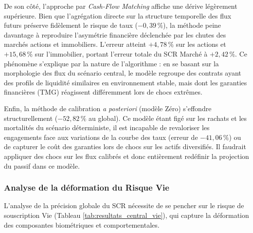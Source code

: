 De son côté, l'approche par \textit{Cash-Flow Matching} affiche une dérive légèrement supérieure. Bien que l'agrégation directe sur la structure temporelle des flux futurs préserve fidèlement le risque de taux ($-0{,}39\,\%$), la méthode peine davantage à reproduire l'asymétrie financière déclenchée par les chutes des marchés actions et immobiliers. L'erreur atteint $+4{,}78\,\%$ sur les actions et $+15{,}68\,\%$ sur l'immobilier, portant l'erreur totale du SCR Marché à $+2{,}42\,\%$. Ce phénomène s'explique par la nature de l'algorithme : en se basant sur la morphologie des flux du scénario central, le modèle regroupe des contrats ayant des profils de liquidité similaires en environnement stable, mais dont les garanties financières (TMG) réagissent différemment lors de chocs extrêmes.

Enfin, la méthode de calibration \textit{a posteriori} (modèle Zéro) s'effondre structurellement ($-52{,}82\,\%$ au global). Ce modèle étant figé sur les rachats et les mortalités du scénario déterministe, il est incapable de revaloriser les engagements face aux variations de la courbe des taux (erreur de $-41{,}06\,\%$) ou de capturer le coût des garanties lors de chocs sur les actifs diversifiés. Il faudrait appliquer des chocs sur les flux calibrés et donc entièrement redéfinir la projection du passif dans ce modèle.

\subsubsection{Analyse de la déformation du Risque Vie}

L'analyse de la précision globale du SCR nécessite de se pencher sur le risque de souscription Vie (Tableau \ref{tab:resultats_central_vie}), qui capture la déformation des composantes biométriques et comportementales.

